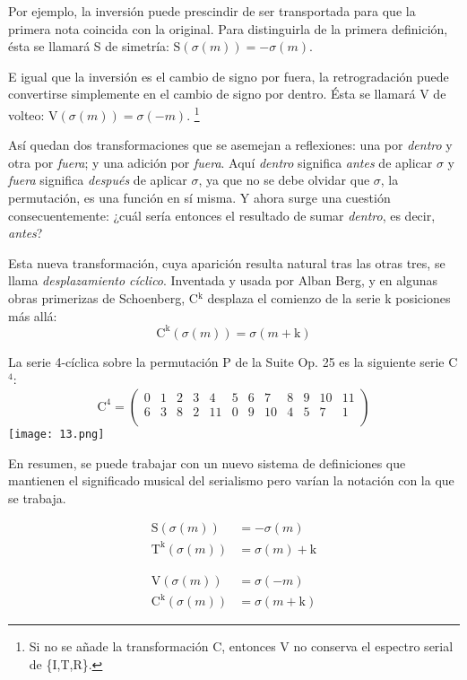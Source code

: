 		Por ejemplo, la inversión puede prescindir de ser transportada para que la primera nota coincida con la original. Para distinguirla de la primera definición, ésta se llamará S de simetría: $\text{S}(\sigma(m)) = -\sigma(m)$.
		
		E igual que la inversión es el cambio de signo por fuera, la retrogradación puede convertirse simplemente en el cambio de signo por dentro. Ésta se llamará V de volteo: $\text{V}(\sigma(m)) = \sigma(-m)$. \footnote{Si no se añade la transformación C, entonces V no conserva el espectro serial de \{I,T,R\}.}
		
		Así quedan dos transformaciones que se asemejan a reflexiones: una por \textit{dentro} y otra por \textit{fuera}; y una adición por \textit{fuera}. Aquí \textit{dentro} significa \textit{antes} de aplicar $\sigma$ y \textit{fuera} significa \textit{después} de aplicar $\sigma$, ya que no se debe olvidar que $\sigma$, la permutación, es una función en sí misma. Y ahora surge una cuestión consecuentemente: ¿cuál sería entonces el resultado de sumar \textit{dentro}, es decir, \textit{antes}?
		
		Esta nueva transformación, cuya aparición resulta natural tras las otras tres, se llama \textit{desplazamiento cíclico}. Inventada y usada por Alban Berg, y en algunas obras primerizas de Schoenberg, C$^\text{k}$ desplaza el comienzo de la serie k posiciones más allá:
		\[\text{C}^\text{k}\left(\sigma\left(m\right)\right)=\sigma\left(m+\text{k}\right)\]		
		
		La serie 4-cíclica sobre la permutación P de la Suite Op. 25 es la siguiente serie C$^4$:	
		\[\text{C}^4=\left(\begin{matrix}0&1&2&3&4&5&6&7&8&9&10&11\\6&3&8&2&11&0&9&10&4&5&7&1\\\end{matrix}\right)\]		
		\texttt{[image: 13.png]}
		
		En resumen, se puede trabajar con un nuevo sistema de definiciones que mantienen el significado musical del serialismo pero varían la notación con la que se trabaja. 
		\vspace{-\bigskipamount}
		\begin{multicols}{2}
		\begin{align*}
		\text{S}(\sigma(m)) &= -\sigma(m)\\
		\text{T}^\text{k}(\sigma(m)) &= \sigma(m) + \text{k}
		\end{align*}
		
		\begin{align*}
		\text{V}(\sigma(m)) &= \sigma(-m)\\
		\text{C}^\text{k}(\sigma(m)) &= \sigma(m+\text{k})
		\end{align*}
		\end{multicols}
	
